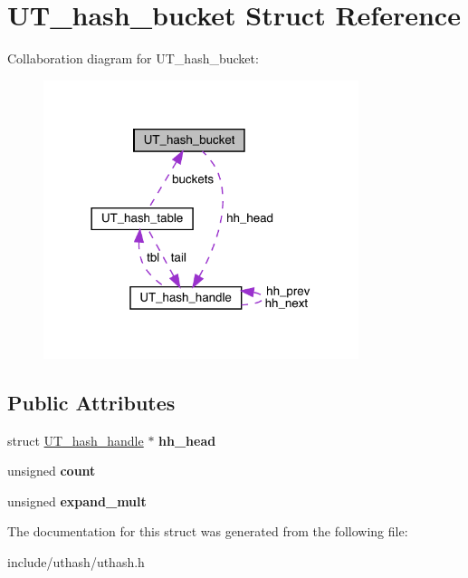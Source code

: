 \hypertarget{struct_u_t__hash__bucket}{}\section{U\+T\+\_\+hash\+\_\+bucket Struct Reference}
\label{struct_u_t__hash__bucket}


Collaboration diagram for U\+T\+\_\+hash\+\_\+bucket\+:\nopagebreak
\begin{figure}[H]
\begin{center}
\leavevmode
\includegraphics[width=261pt]{struct_u_t__hash__bucket__coll__graph}
\end{center}
\end{figure}
\subsection*{Public Attributes}
\begin{DoxyCompactItemize}
\item 
\mbox{\label{struct_u_t__hash__bucket_a785a785132212378bb28fb4341cfecaf}} 
struct \mbox{\hyperlink{struct_u_t__hash__handle}{U\+T\+\_\+hash\+\_\+handle}} $\ast$ {\bfseries hh\+\_\+head}
\item 
\mbox{\label{struct_u_t__hash__bucket_a5d20cc12bdcbde360398910eefb45634}} 
unsigned {\bfseries count}
\item 
\mbox{\label{struct_u_t__hash__bucket_a9b739c1b69c141e8198c0c64af643b2b}} 
unsigned {\bfseries expand\+\_\+mult}
\end{DoxyCompactItemize}


The documentation for this struct was generated from the following file\+:\begin{DoxyCompactItemize}
\item 
include/uthash/uthash.\+h\end{DoxyCompactItemize}
